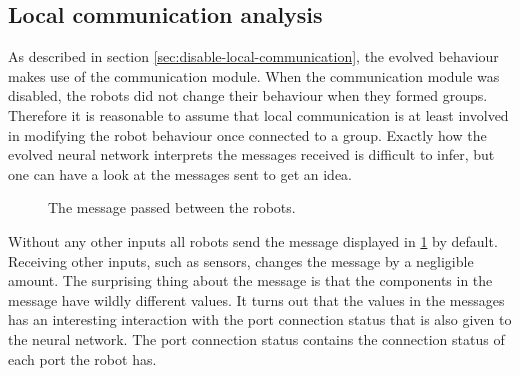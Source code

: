 \subsection{Local communication analysis}
As described in section \ref{sec:disable-local-communication}, the evolved behaviour makes use of the communication module.
When the communication module was disabled, the robots did not change their behaviour when they formed groups.
Therefore it is reasonable to assume that local communication is at least involved in modifying the robot behaviour once connected to a group.
Exactly how the evolved neural network interprets the messages received is difficult to infer, but one can have a look at the messages sent to get an idea.

\begin{figure}[H]
	\centering
	[0.992 0.999 0.423 0.002]
	\label{fig:message_default}
	\caption{The message passed between the robots.}	
\end{figure}

Without any other inputs all robots send the message displayed in \ref{fig:message_default} by default.
Receiving other inputs, such as sensors, changes the message by a negligible amount.
The surprising thing about the message is that the components in the message have wildly different values.
It turns out that the values in the messages has an interesting interaction with the port connection status that is also given to the neural network.
The port connection status contains the connection status of each port the robot has.

